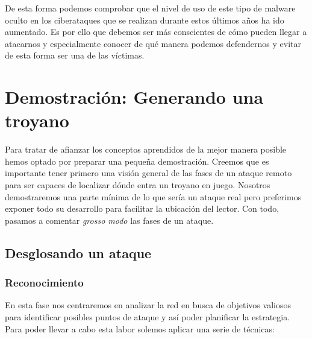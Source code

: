 \documentclass[12pt]{article}
\begin{document}
            De esta forma podemos comprobar que el nivel de uso de este tipo de malware oculto en los ciberataques que se realizan durante estos últimos años ha ido aumentado. Es por ello que debemos ser más conscientes de cómo pueden llegar a atacarnos y especialmente conocer de qué manera podemos defendernos y evitar de esta forma ser una de las víctimas.

    \section{Demostración: Generando una troyano}
        Para tratar de afianzar los conceptos aprendidos de la mejor manera posible hemos optado por preparar una pequeña demostración. Creemos que es importante tener primero una visión general de las fases de un ataque remoto para ser capaces de localizar dónde entra un troyano en juego. Nosotros demostraremos una parte mínima de lo que sería un ataque real pero preferimos exponer todo su desarrollo para facilitar la ubicación del lector. Con todo, pasamos a comentar \textit{grosso modo} las fases de un ataque.

        \subsection{Desglosando un ataque}
            \subsubsection{Reconocimiento}
                En esta fase nos centraremos en analizar la red en busca de objetivos valiosos para identificar posibles puntos de ataque y así poder planificar la estrategia. Para poder llevar a cabo esta labor solemos aplicar una serie de técnicas:
\end{document}
